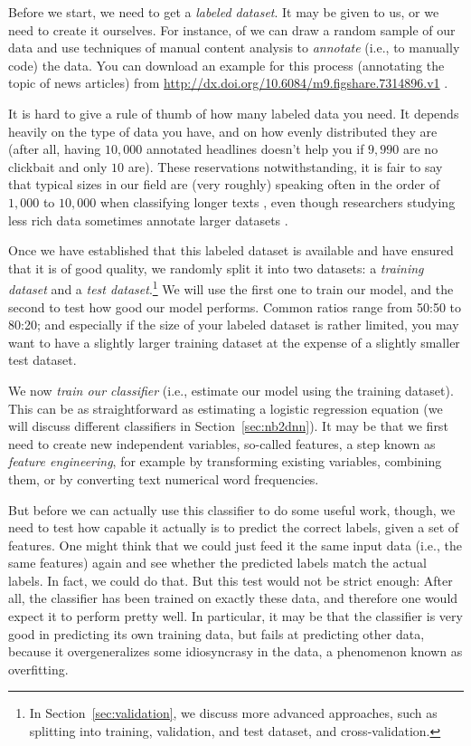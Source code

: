 Before we start, we need to get a \emph{labeled dataset}.
It may be given to us, or we need to create it ourselves.
For instance, of we can draw a random sample of our data and use techniques
of manual content analysis \citep[e.g.,][]{riffe2019analyzing} to
\emph{annotate} (i.e., to manually code) the data.
You can download an example for this process (annotating the topic of news
articles) from \url{http://dx.doi.org/10.6084/m9.figshare.7314896.v1} \citep{Vermeer2018}.

It is hard to give a rule of thumb of how many labeled data you need.
It depends heavily on the type of data you have, and on how evenly distributed
they are (after all, having $10,000$ annotated headlines doesn't help you if
$9,990$ are no clickbait and only $10$ are).
These reservations notwithstanding, it is fair to say that typical sizes in
our field are (very roughly) speaking often in the order of $1,000$ to $10,000$
when classifying longer texts \citep[see, for instance,][]{burscher2014teaching},
even though researchers studying less rich data sometimes annotate larger
datasets \citep[e.g., $60,000$ social media messages in][]{vermeer2019seeing}.

Once we have established that this labeled dataset is available and have
ensured that it is of good quality, we randomly split it into two datasets:
a \emph{training dataset} and a \emph{test dataset}.\footnote{In
  Section~\ref{sec:validation}, we discuss more advanced approaches, such
  as splitting into training, validation, and test dataset, and cross-validation.}
We will use the first one to train our model, and the second to test how
good our model performs. Common ratios range from 50:50 to 80:20; and especially
if the size of your labeled dataset is rather limited, you may want to have
a slightly larger training dataset at the expense of a slightly smaller test
dataset.

We now \emph{train our classifier} (i.e., estimate our model using the
training dataset). This can be as straightforward as estimating a logistic
regression equation (we will discuss different classifiers in
Section~\ref{sec:nb2dnn}).
It may be that we first need to create new independent variables, so-called
features, a step known as \emph{feature engineering}, for example by transforming
existing variables, combining them, or by converting text numerical word frequencies.

But before we can actually use this classifier to do some useful work, though,
we need to test how capable it actually is to predict the correct labels,
given a set of features. One might think that we could just feed it the same
input data (i.e., the same features) again and see whether the predicted labels
match the actual labels.
In fact, we could do that.
But this test would not be strict enough:
After all, the classifier has been trained on exactly these data, and therefore
one would expect it to perform pretty well.
In particular, it may be that the classifier is very good in predicting its
own training data, but fails at predicting other data, because it overgeneralizes
some idiosyncrasy in the data, a phenomenon known as overfitting.

